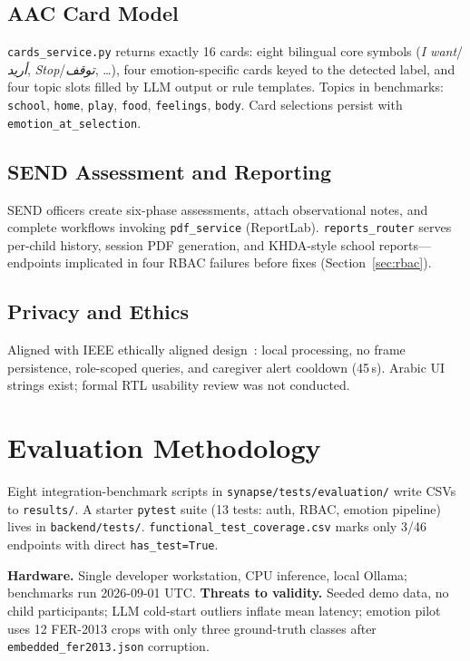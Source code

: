 \documentclass[conference]{IEEEtran}
\begin{document}
\subsection{AAC Card Model}
\texttt{cards\_service.py} returns exactly 16 cards: eight bilingual core symbols (\emph{I want}/\emph{أريد}, \emph{Stop}/\emph{توقف}, \ldots), four emotion-specific cards keyed to the detected label, and four topic slots filled by LLM output or rule templates. Topics in benchmarks: \texttt{school}, \texttt{home}, \texttt{play}, \texttt{food}, \texttt{feelings}, \texttt{body}. Card selections persist with \texttt{emotion\_at\_selection}.

\subsection{SEND Assessment and Reporting}
SEND officers create six-phase assessments, attach observational notes, and complete workflows invoking \texttt{pdf\_service} (ReportLab). \texttt{reports\_router} serves per-child history, session PDF generation, and KHDA-style school reports---endpoints implicated in four RBAC failures before fixes (Section~\ref{sec:rbac}).

\subsection{Privacy and Ethics}
Aligned with IEEE ethically aligned design~\cite{ieee2019,unicef2021}: local processing, no frame persistence, role-scoped queries, and caregiver alert cooldown (45\,s). Arabic UI strings exist; formal RTL usability review was not conducted.

\section{Evaluation Methodology}
Eight integration-benchmark scripts in \texttt{synapse/tests/evaluation/} write CSVs to \texttt{results/}. A starter \texttt{pytest} suite (13 tests: auth, RBAC, emotion pipeline) lives in \texttt{backend/tests/}. \texttt{functional\_test\_coverage.csv} marks only 3/46 endpoints with direct \texttt{has\_test=True}.

\textbf{Hardware.} Single developer workstation, CPU inference, local Ollama; benchmarks run 2026-09-01 UTC. \textbf{Threats to validity.} Seeded demo data, no child participants; LLM cold-start outliers inflate mean latency; emotion pilot uses 12 FER-2013 crops with only three ground-truth classes after \texttt{embedded\_fer2013.json} corruption.
\end{document}
